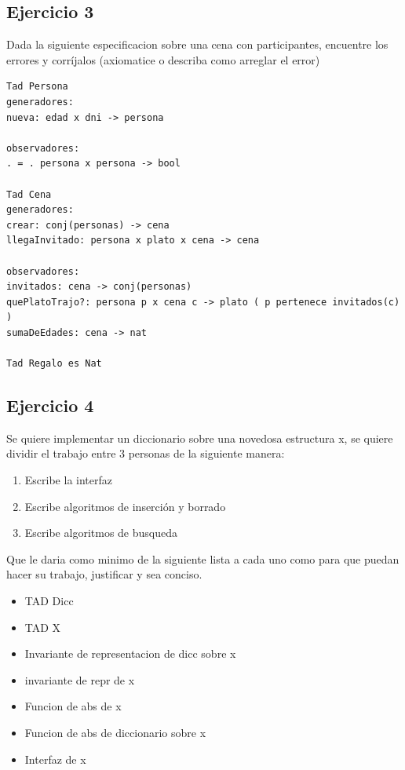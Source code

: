 \documentclass[10pt, a4paper]{report}
\begin{document}
\subsection*{Ejercicio 3}

Dada la siguiente especificacion sobre una cena con participantes, encuentre los errores y corr\'ijalos (axiomatice o describa como arreglar el error)

\begin{verbatim}
Tad Persona
generadores:
nueva: edad x dni -> persona

observadores:
. = . persona x persona -> bool

Tad Cena
generadores:
crear: conj(personas) -> cena
llegaInvitado: persona x plato x cena -> cena

observadores:
invitados: cena -> conj(personas)
quePlatoTrajo?: persona p x cena c -> plato ( p pertenece invitados(c) )
sumaDeEdades: cena -> nat

Tad Regalo es Nat
\end{verbatim}


\subsection*{Ejercicio 4}

Se quiere implementar un diccionario sobre una novedosa estructura x, se quiere dividir el trabajo entre 3 personas de la siguiente manera:
\begin{enumerate}
 \item Escribe la interfaz
 \item Escribe algoritmos de inserci\'on y borrado 
 \item Escribe algoritmos de busqueda
\end{enumerate}

Que le daria como minimo de la siguiente lista a cada uno como para que puedan hacer su trabajo, justificar y sea conciso.

\begin{itemize}
 \item TAD Dicc
 \item TAD X
 \item Invariante de representacion de dicc sobre x
 \item invariante de repr de x
 \item Funcion de abs de x
 \item Funcion de abs de diccionario sobre x
 \item Interfaz de x
\end{itemize}
\end{document}
